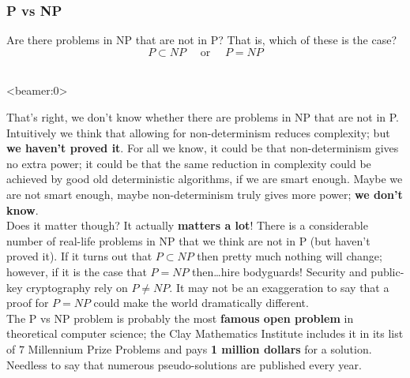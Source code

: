 \documentclass[handout, 12pt]{beamer}
\begin{document}
\begin{frame}

\frametitle{P vs NP}

Are there problems in NP that are not in P? That is, which of these is the case?
\begin{equation*}
P\subset NP\quad\text{ or }\quad
P = NP
\end{equation*}
\pause
\\[2em]
\centering
\color{red}{\huge We don't know!}

\end{frame}

\begin{frame}<beamer:0>

\footnotesize
That's right, we don't know whether there are problems in NP that are not in P. Intuitively we think that allowing for non-determinism reduces complexity; but \textbf{we haven't proved it}. For all we know, it could be that non-determinism gives no extra power; it could be that the same reduction in complexity could be achieved by good old deterministic algorithms, if we are smart enough. Maybe we are not smart enough, maybe non-determinism truly gives more power; \textbf{we don't know}.
\\[0.6em]
Does it matter though? It actually \textbf{matters a lot}! There is a considerable number of real-life problems in NP that we think are not in P (but haven't proved it). If it turns out that $P\subset NP$ then pretty much nothing will change; however, if it is the case that $P = NP$ then\ldots hire bodyguards! Security and public-key cryptography rely on $P \neq NP$. It may not be an exaggeration to say that a proof for $P = NP$ could make the world dramatically different.
\\[0.6em]
The P vs NP problem is probably the most \textbf{famous open problem} in theoretical computer science; the Clay Mathematics Institute includes it in its list of $7$ Millennium Prize Problems and pays \textbf{1 million dollars} for a solution. Needless to say that numerous pseudo-solutions are published every year.

\end{frame}
\end{document}
